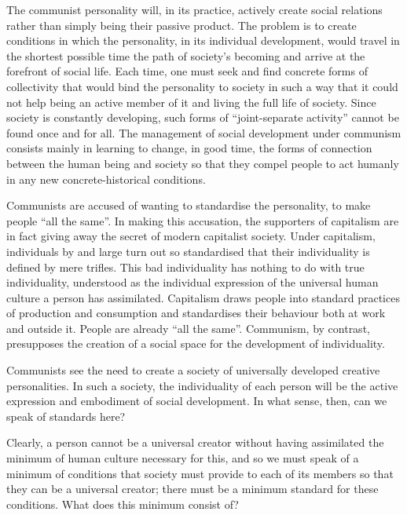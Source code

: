 \documentclass[../main]{subfiles}
\begin{document}
The communist personality will, in its practice, actively create social relations rather than simply being their passive product. The problem is to create conditions in which the personality, in its individual development, would travel in the shortest possible time the path of society’s becoming and arrive at the forefront of social life. Each time, one must seek and find concrete forms of collectivity that would bind the personality to society in such a way that it could not help being an active member of it and living the full life of society. Since society is constantly developing, such forms of “joint-separate activity” cannot be found once and for all. The management of social development under communism consists mainly in learning to change, in good time, the forms of connection between the human being and society so that they compel people to act humanly in any new concrete-historical conditions.

Communists are accused of wanting to standardise the personality, to make people “all the same”. In making this accusation, the supporters of capitalism are in fact giving away the secret of modern capitalist society. Under capitalism, individuals by and large turn out so standardised that their individuality is defined by mere trifles. This bad individuality has nothing to do with true individuality, understood as the individual expression of the universal human culture a person has assimilated. Capitalism draws people into standard practices of production and consumption and standardises their behaviour both at work and outside it. People are already “all the same”. Communism, by contrast, presupposes the creation of a social space for the development of individuality.

Communists see the need to create a society of universally developed creative personalities. In such a society, the individuality of each person will be the active expression and embodiment of social development. In what sense, then, can we speak of standards here?

Clearly, a person cannot be a universal creator without having assimilated the minimum of human culture necessary for this, and so we must speak of a minimum of conditions that society must provide to each of its members so that they can be a universal creator; there must be a minimum standard for these conditions. What does this minimum consist of?
\end{document}
